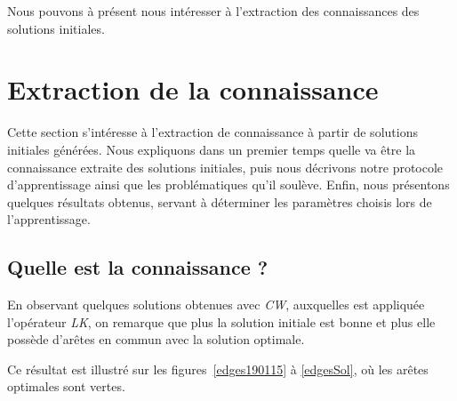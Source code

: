 \documentclass[a4paper,11pt]{article}%
\begin{document}
Nous pouvons à présent nous intéresser à l'extraction des connaissances des solutions initiales.

\section{Extraction de la connaissance}
\label{extraction}
Cette section s'intéresse à l'extraction de connaissance à partir de solutions initiales générées. 
Nous expliquons dans un premier temps quelle va être la connaissance extraite des solutions initiales, puis nous décrivons notre protocole d'apprentissage ainsi que les problématiques qu'il soulève.
Enfin, nous présentons quelques résultats obtenus, servant à déterminer les paramètres choisis lors de l'apprentissage. 

\subsection{Quelle est la connaissance ?}

En observant quelques solutions obtenues avec \emph{CW}, auxquelles est appliquée l'opérateur \emph{LK}, on remarque que plus la solution initiale est bonne et plus elle possède d'arêtes en commun avec la solution optimale. 

Ce résultat est illustré sur les figures~\ref{edges190115} à \ref{edgesSol}, où les arêtes optimales sont vertes.
\end{document}
